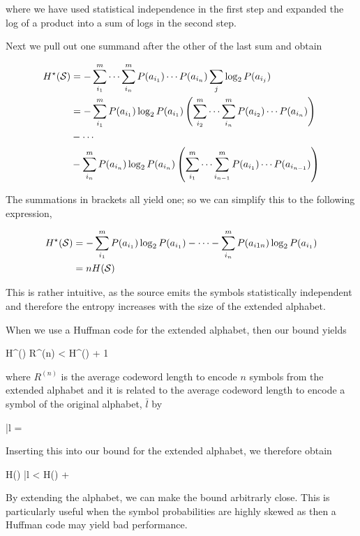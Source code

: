 where we have used statistical independence in the first step and expanded the log of a product into a sum of logs in the second step.

Next we pull out one summand after the other of the last sum and obtain

\begin{align*}
    H^\star(\mathcal{S}) &= - \sum_{i_1}^m \cdots \sum_{i_n}^m P(a_{i_1})  \cdots P(a_{i_n}) \sum_j \log_2 P(a_{i_j}) \\
    &= - \sum_{i_1}^m P(a_{i_1}) \log_2 P(a_{i_1}) \left( \sum_{i_2}^m \cdots \sum_{i_n}^m P(a_{i_2})  \cdots P(a_{i_n}) \right) \\ 
    &- \cdots \\
    &- \sum_{i_n}^m P(a_{i_n}) \log_2 P(a_{i_n}) \left( \sum_{i_1}^m \cdots \sum_{i_{n-1}}^m P(a_{i_1})  \cdots P(a_{i_{n-1}}) \right)
\end{align*}

The summations in brackets all yield one; so we can simplify this to the following expression,

\begin{align*}
    H^\star(\mathcal{S}) &= - \sum_{i_1}^m P(a_{i_1}) \log_2 P(a_{i_1}) - \cdots - \sum_{i_n}^m P(a_{i1n}) \log_2 P(a_{i_1}) \\
    &= n H(\mathcal{S})
\end{align*}

This is rather intuitive, as the source emits the symbols statistically independent and therefore the entropy increases with the size of the extended alphabet.

When we use a Huffman code for the extended alphabet, then our bound yields

\bee
H^\star(\Sc) \leq R^{(n)} < H^\star(\Sc) + 1
\eee

where $R^{(n)}$ is the average codeword length to encode $n$ symbols from the extended alphabet and it is related to the average codeword length to encode a symbol of the original alphabet, $\bar{l}$ by

\bee
\bar{l} = 
\eee

Inserting this into our bound for the extended alphabet, we therefore obtain

\bee
H(\Sc) \leq \bar{l} < H(\Sc) + 
\eee

By extending the alphabet, we can make the bound arbitrarly close. This is particularly useful when the symbol probabilities are highly skewed as then a Huffman code may yield bad performance.


